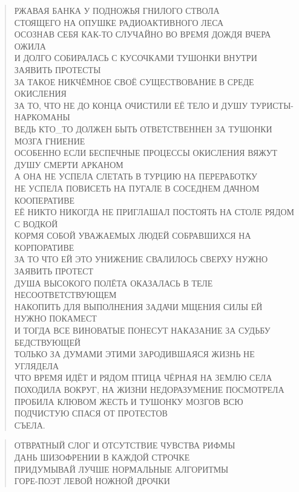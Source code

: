 \poemtitle{***}
\begin{verse}
РЖАВАЯ БАНКА У ПОДНОЖЬЯ ГНИЛОГО СТВОЛА\\
СТОЯЩЕГО НА ОПУШКЕ РАДИОАКТИВНОГО ЛЕСА\\
ОСОЗНАВ СЕБЯ КАК-ТО СЛУЧАЙНО ВО ВРЕМЯ ДОЖДЯ ВЧЕРА ОЖИЛА\\
И ДОЛГО СОБИРАЛАСЬ С КУСОЧКАМИ ТУШОНКИ ВНУТРИ ЗАЯВИТЬ ПРОТЕСТЫ\\
ЗА ТАКОЕ НИКЧЁМНОЕ СВОЁ СУЩЕСТВОВАНИЕ В СРЕДЕ ОКИСЛЕНИЯ\\
ЗА ТО, ЧТО НЕ ДО КОНЦА ОЧИСТИЛИ ЕЁ ТЕЛО И ДУШУ ТУРИСТЫ-НАРКОМАНЫ\\
ВЕДЬ КТО\_ТО ДОЛЖЕН БЫТЬ ОТВЕТСТВЕННЕН ЗА ТУШОНКИ МОЗГА ГНИЕНИЕ\\
ОСОБЕННО ЕСЛИ БЕСПЕЧНЫЕ ПРОЦЕССЫ ОКИСЛЕНИЯ ВЯЖУТ ДУШУ СМЕРТИ АРКАНОМ\\
А ОНА НЕ УСПЕЛА СЛЕТАТЬ В ТУРЦИЮ НА ПЕРЕРАБОТКУ\\
НЕ УСПЕЛА ПОВИСЕТЬ НА ПУГАЛЕ В СОСЕДНЕМ ДАЧНОМ КООПЕРАТИВЕ\\
ЕЁ НИКТО НИКОГДА НЕ ПРИГЛАШАЛ ПОСТОЯТЬ НА СТОЛЕ РЯДОМ С ВОДКОЙ\\
КОРМЯ СОБОЙ УВАЖАЕМЫХ ЛЮДЕЙ СОБРАВШИХСЯ НА КОРПОРАТИВЕ\\
ЗА ТО ЧТО ЕЙ ЭТО УНИЖЕНИЕ СВАЛИЛОСЬ СВЕРХУ НУЖНО ЗАЯВИТЬ ПРОТЕСТ\\
ДУША ВЫСОКОГО ПОЛЁТА ОКАЗАЛАСЬ В ТЕЛЕ НЕСООТВЕТСТВУЮЩЕМ\\
НАКОПИТЬ ДЛЯ ВЫПОЛНЕНИЯ ЗАДАЧИ МЩЕНИЯ СИЛЫ ЕЙ НУЖНО ПОКАМЕСТ\\
И ТОГДА ВСЕ ВИНОВАТЫЕ ПОНЕСУТ НАКАЗАНИЕ ЗА СУДЬБУ БЕДСТВУЮЩЕЙ\\
ТОЛЬКО ЗА ДУМАМИ ЭТИМИ ЗАРОДИВШАЯСЯ ЖИЗНЬ НЕ УГЛЯДЕЛА\\
ЧТО ВРЕМЯ ИДЁТ И РЯДОМ ПТИЦА ЧЁРНАЯ НА ЗЕМЛЮ СЕЛА\\
ПОХОДИЛА ВОКРУГ, НА ЖИЗНИ НЕДОРАЗУМЕНИЕ ПОСМОТРЕЛА\\
ПРОБИЛА КЛЮВОМ ЖЕСТЬ И ТУШОНКУ МОЗГОВ ВСЮ ПОДЧИСТУЮ СПАСЯ ОТ ПРОТЕСТОВ\\
СЪЕЛА.
\end{verse}

\poemtitle{***}
\begin{verse}
ОТВРАТНЫЙ СЛОГ И ОТСУТСТВИЕ ЧУВСТВА РИФМЫ\\
ДАНЬ ШИЗОФРЕНИИ В КАЖДОЙ СТРОЧКЕ\\
ПРИДУМЫВАЙ ЛУЧШЕ НОРМАЛЬНЫЕ АЛГОРИТМЫ\\
ГОРЕ-ПОЭТ ЛЕВОЙ НОЖНОЙ ДРОЧКИ
\end{verse}

